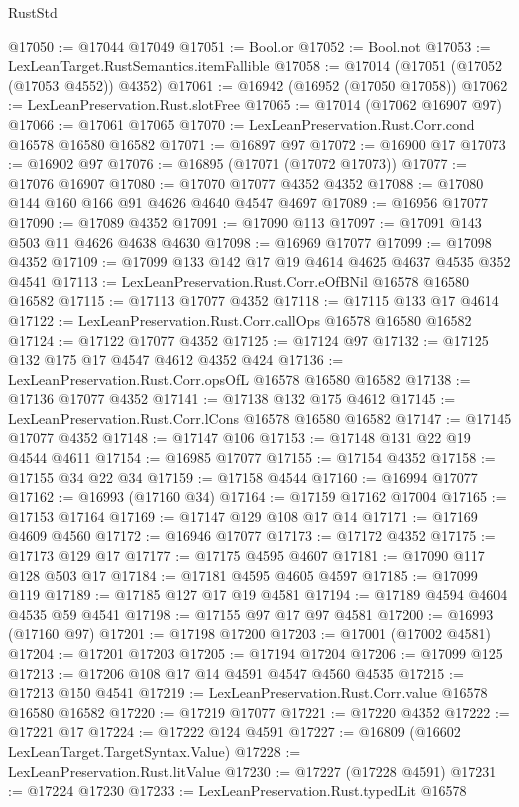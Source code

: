 \begin{lexlean}{RustStd}
\begin{coremodule}
@17050 := @17044 @17049
@17051 := Bool.or
@17052 := Bool.not
@17053 := LexLeanTarget.RustSemantics.itemFallible
@17058 := @17014 (@17051 (@17052 (@17053 @4552)) @4352)
@17061 := @16942 (@16952 (@17050 @17058))
@17062 := LexLeanPreservation.Rust.slotFree
@17065 := @17014 (@17062 @16907 @97)
@17066 := @17061 @17065
@17070 := LexLeanPreservation.Rust.Corr.cond @16578 @16580 @16582
@17071 := @16897 @97
@17072 := @16900 @17
@17073 := @16902 @97
@17076 := @16895 (@17071 (@17072 @17073))
@17077 := @17076 @16907
@17080 := @17070 @17077 @4352 @4352
@17088 := @17080 @144 @160 @166 @91 @4626 @4640 @4547 @4697
@17089 := @16956 @17077
@17090 := @17089 @4352
@17091 := @17090 @113
@17097 := @17091 @143 @503 @11 @4626 @4638 @4630
@17098 := @16969 @17077
@17099 := @17098 @4352
@17109 := @17099 @133 @142 @17 @19 @4614 @4625 @4637 @4535 @352 @4541
@17113 := LexLeanPreservation.Rust.Corr.eOfBNil @16578 @16580 @16582
@17115 := @17113 @17077 @4352
@17118 := @17115 @133 @17 @4614
@17122 := LexLeanPreservation.Rust.Corr.callOps @16578 @16580 @16582
@17124 := @17122 @17077 @4352
@17125 := @17124 @97
@17132 := @17125 @132 @175 @17 @4547 @4612 @4352 @424
@17136 := LexLeanPreservation.Rust.Corr.opsOfL @16578 @16580 @16582
@17138 := @17136 @17077 @4352
@17141 := @17138 @132 @175 @4612
@17145 := LexLeanPreservation.Rust.Corr.lCons @16578 @16580 @16582
@17147 := @17145 @17077 @4352
@17148 := @17147 @106
@17153 := @17148 @131 @22 @19 @4544 @4611
@17154 := @16985 @17077
@17155 := @17154 @4352
@17158 := @17155 @34 @22 @34
@17159 := @17158 @4544
@17160 := @16994 @17077
@17162 := @16993 (@17160 @34)
@17164 := @17159 @17162 @17004
@17165 := @17153 @17164
@17169 := @17147 @129 @108 @17 @14
@17171 := @17169 @4609 @4560
@17172 := @16946 @17077
@17173 := @17172 @4352
@17175 := @17173 @129 @17
@17177 := @17175 @4595 @4607
@17181 := @17090 @117 @128 @503 @17
@17184 := @17181 @4595 @4605 @4597
@17185 := @17099 @119
@17189 := @17185 @127 @17 @19 @4581
@17194 := @17189 @4594 @4604 @4535 @59 @4541
@17198 := @17155 @97 @17 @97 @4581
@17200 := @16993 (@17160 @97)
@17201 := @17198 @17200
@17203 := @17001 (@17002 @4581)
@17204 := @17201 @17203
@17205 := @17194 @17204
@17206 := @17099 @125
@17213 := @17206 @108 @17 @14 @4591 @4547 @4560 @4535
@17215 := @17213 @150 @4541
@17219 := LexLeanPreservation.Rust.Corr.value @16578 @16580 @16582
@17220 := @17219 @17077
@17221 := @17220 @4352
@17222 := @17221 @17
@17224 := @17222 @124 @4591
@17227 := @16809 (@16602 LexLeanTarget.TargetSyntax.Value)
@17228 := LexLeanPreservation.Rust.litValue
@17230 := @17227 (@17228 @4591)
@17231 := @17224 @17230
@17233 := LexLeanPreservation.Rust.typedLit @16578

\end{coremodule}
\end{lexlean}
